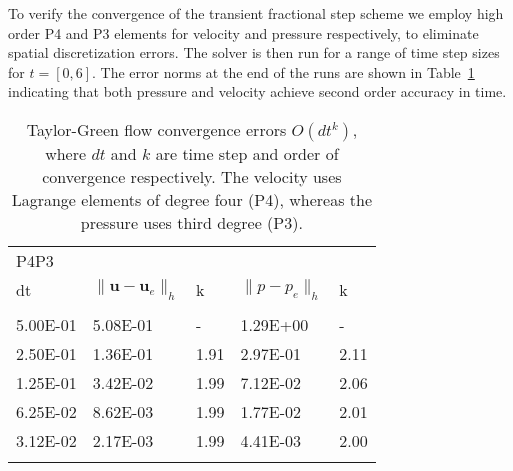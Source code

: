 \documentclass[final,3p,times,twocolumn]{elsarticle}
\begin{document}
To verify the convergence of the transient fractional step scheme we employ high order P4 and P3 elements for velocity and pressure respectively, to eliminate spatial discretization errors. The solver is then run for a range of time step sizes for $t=[0, 6]$. The error norms at the end of the runs are shown in Table~\ref{tab:orderP4P3} indicating that both pressure and velocity achieve second order accuracy in time.
\begin{table}[t!]
\caption{Taylor-Green flow convergence errors $O(dt^k)$, where $dt$ and $k$ are time step and order of convergence respectively. The velocity uses Lagrange elements of degree four (P4), whereas the pressure uses third degree (P3).}
\label{tab:orderP4P3}
\begin{tabular}{p{4em} p{4em} p{2em} p{4em} p{2em}}
    \\
   P4P3 \\
\rule{0pt}{3ex}    
   dt & ${\| \bm{u} -\bm{u}_e\|_h} $ & k & ${\| p-p_e \|_h} $  & k  \\
   \hline \\   
   5.00E-01 &   5.08E-01 & -  &   1.29E+00 & - \\ 
   2.50E-01 &   1.36E-01 & 1.91  &   2.97E-01 & 2.11 \\ 
   1.25E-01 &   3.42E-02 & 1.99  &   7.12E-02 & 2.06 \\ 
   6.25E-02 &   8.62E-03 & 1.99  &   1.77E-02 & 2.01 \\ 
   3.12E-02 &   2.17E-03 & 1.99  &   4.41E-03 & 2.00 \\ 
  \hline \\
\end{tabular}
\end{table}
\end{document}
